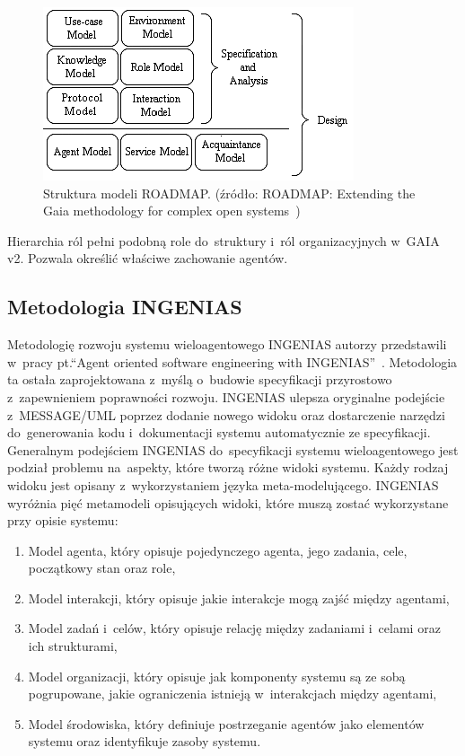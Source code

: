 \documentclass[11pt]{report}
\begin{document}
    \begin{figure}[!ht]
        \centering
        \includegraphics[width=\linewidth]{fig/roadmap models.png}
        \caption{Struktura modeli ROADMAP. (źródło: ROADMAP: Extending the Gaia methodology for complex open systems~\cite{Juan2002a})}
        \label{fig:roadmap}
    \end{figure}

    Hierarchia ról pełni podobną role do~struktury i~ról organizacyjnych w~GAIA v2.
    Pozwala określić właściwe zachowanie agentów.

    \subsection{Metodologia INGENIAS}
    Metodologię rozwoju systemu wieloagentowego INGENIAS autorzy przedstawili w~pracy pt.\@ ``Agent oriented software engineering with INGENIAS''~\cite{Pavon2003}.
    Metodologia ta ostała zaprojektowana z~myślą o~budowie specyfikacji przyrostowo z~zapewnieniem poprawności rozwoju.
    INGENIAS ulepsza oryginalne podejście z~MESSAGE/UML poprzez dodanie nowego widoku oraz dostarczenie narzędzi do~generowania kodu i~dokumentacji systemu automatycznie ze specyfikacji.
    Generalnym podejściem INGENIAS do~specyfikacji systemu wieloagentowego jest podział problemu na~aspekty, które tworzą różne widoki systemu.
    Każdy rodzaj widoku jest opisany z~wykorzystaniem języka meta-modelującego.
    INGENIAS wyróżnia pięć metamodeli opisujących widoki, które muszą zostać wykorzystane przy opisie systemu:
    \begin{enumerate}
        \item Model agenta, który opisuje pojedynczego agenta, jego zadania, cele, początkowy stan oraz role,
        \item Model interakcji, który opisuje jakie interakcje mogą zajść między agentami,
        \item Model zadań i~celów, który opisuje relację między zadaniami i~celami oraz ich strukturami,
        \item Model organizacji, który opisuje jak komponenty systemu są ze sobą pogrupowane, jakie ograniczenia istnieją w~interakcjach między agentami,
        \item Model środowiska, który definiuje postrzeganie agentów jako elementów systemu oraz identyfikuje zasoby systemu.
    \end{enumerate}
\end{document}
